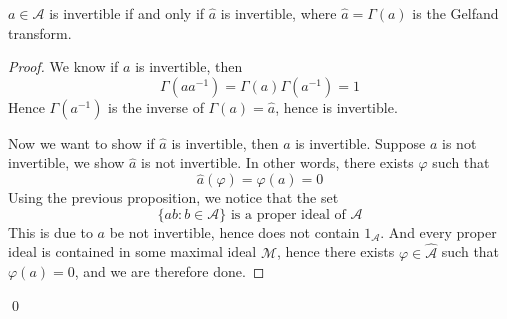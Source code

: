 \begin{corollary}
    $a\in\mathcal{A}$ is invertible if and only if $\widehat{a}$ is invertible, where $\widehat{a}=\Gamma(a)$ is the Gelfand transform.
\end{corollary}
\begin{proof}
    We know if $a$ is invertible, then 
    \begin{equation*}
        \Gamma(aa^{-1})=\Gamma(a)\Gamma(a^{-1})=1
    \end{equation*}
    Hence $\Gamma(a^{-1})$ is the inverse of $\Gamma(a)=\widehat{a}$, hence is invertible.

    Now we want to show if $\widehat{a}$ is invertible, then $a$ is invertible. Suppose $a$ is not invertible, we show $\widehat{a}$ is not invertible. In other words, there exists $\varphi$ such that 
    \begin{equation*}
        \widehat{a}(\varphi)=\varphi(a)=0
    \end{equation*}
    Using the previous proposition, we notice that the set
    \begin{equation*}
        \{ab: b\in\mathcal{A}\} \text{ is a proper ideal of } \mathcal{A}
    \end{equation*}
    This is due to $a$ be not invertible, hence does not contain $1_\mathcal{A}$. And every proper ideal is contained in some maximal ideal $\mathcal{M}$, hence there exists $\varphi\in\widehat{\mathcal{A}}$ such that $\varphi(a)=0$, and we are therefore done.
\end{proof}
\qed

